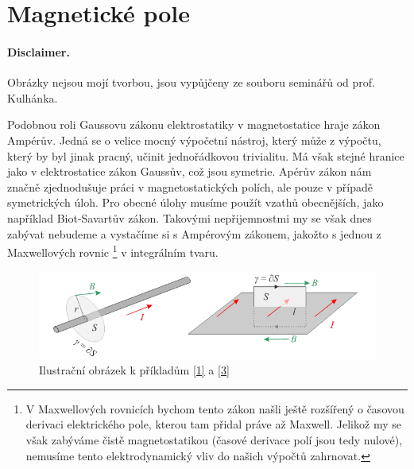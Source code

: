 \documentclass[11pt,a4paper]{report}
\theoremstyle{theorem}
\theoremstyle{remark}
\theoremstyle{definition}
\begin{document}
	
	
	\section*{Magnetické pole}
		
		\paragraph*{Disclaimer.} Obrázky nejsou mojí tvorbou, jsou vypůjčeny ze souboru seminářů od prof. Kulhánka.
		
		Podobnou roli Gaussovu zákonu elektrostatiky v magnetostatice hraje zákon Ampérův. Jedná se o velice mocný výpočetní nástroj, který může z výpočtu, který by byl jinak pracný, učinit jednořádkovou trivialitu. Má však stejné hranice jako v elektrostatice zákon Gaussův, což jsou symetrie. Apérův zákon nám značně zjednodušuje práci v magnetostatických polích, ale pouze v případě symetrických úloh. Pro obecné úlohy musíme použít vzathů obecnějších, jako například Biot-Savartův zákon. Takovými nepřijemnostmi my se však dnes zabývat nebudeme a vystačíme si s Ampérovým zákonem, jakožto s jednou z Maxwellových rovnic%
			\footnote{V Maxwellových rovnicích bychom tento zákon našli ještě rozšířený o časovou derivaci elektrického pole, kterou tam přidal práve až Maxwell. Jelikož my se však zabýváme čistě magnetostatikou (časové derivace polí jsou tedy nulové), nemusíme tento elektrodynamický vliv do našich výpočtů zahrnovat.}
		v integrálním tvaru.
		
		\begin{figure}[h!]
			\begin{center}
				\includegraphics[width=0.9\linewidth]{img/1.png}
				\caption{Ilustrační obrázek k příkladům \ref{1} a \ref{3}}
			\end{center}
		\end{figure}
		
\end{document}
